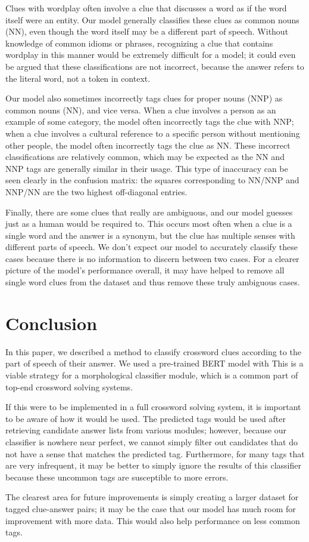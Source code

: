 \documentclass[11pt]{article}
\begin{document}
Clues with wordplay often involve a clue that discusses a word as if the word itself were an entity. Our model generally classifies these clues as common nouns (NN), even though the word itself may be a different part of speech. Without knowledge of common idioms or phrases, recognizing a clue that contains wordplay in this manner would be extremely difficult for a model; it could even be argued that these classifications are not incorrect, because the answer refers to the literal word, not a token in context.

Our model also sometimes incorrectly tags clues for proper nouns (NNP) as common nouns (NN), and vice versa. When a clue involves a person as an example of some category, the model often incorrectly tags the clue with NNP; when a clue involves a cultural reference to a specific person without mentioning other people, the model often incorrectly tags the clue as NN. These incorrect classifications are relatively common, which may be expected as the NN and NNP tags are generally similar in their usage. This type of inaccuracy can be seen clearly in the confusion matrix: the squares corresponding to NN/NNP and NNP/NN are the two highest off-diagonal entries.

Finally, there are some clues that really are ambiguous, and our model guesses just as a human would be required to. This occurs most often when a clue is a single word and the answer is a synonym, but the clue has multiple senses with different parts of speech. We don't expect our model to accurately classify these cases because there is no information to discern between two cases. For a clearer picture of the model's performance overall, it may have helped to remove all single word clues from the dataset and thus remove these truly ambiguous cases.

\section{Conclusion}

In this paper, we described a method to classify crossword clues according to the part of speech of their answer. We used a pre-trained BERT model with  This is a viable strategy for a morphological classifier module, which is a common part of top-end crossword solving systems. 

If this were to be implemented in a full crossword solving system, it is important to be aware of how it would be used. The predicted tags would be used after retrieving candidate answer lists from various modules; however, because our classifier is nowhere near perfect, we cannot simply filter out candidates that do not have a sense that matches the predicted tag. Furthermore, for many tags that are very infrequent, it may be better to simply ignore the results of this classifier because these uncommon tags are susceptible to more errors.

The clearest area for future improvements is simply creating a larger dataset for tagged clue-answer pairs; it may be the case that our model has much room for improvement with more data. This would also help performance on less common tags.



\end{document}
